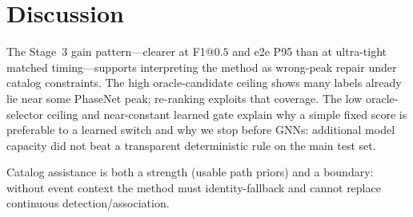 \section{Discussion}
\label{sec:discussion}

The Stage~3 gain pattern---clearer at F1@$0.5$ and e2e P95 than at ultra-tight
matched timing---supports interpreting the method as wrong-peak repair under
catalog constraints.
The high oracle-candidate ceiling shows many labels already lie near some
PhaseNet peak; re-ranking exploits that coverage.
The low oracle-selector ceiling and near-constant learned gate explain why a
simple fixed score is preferable to a learned switch and why we stop before
GNNs: additional model capacity did not beat a transparent deterministic rule
on the main test set.

Catalog assistance is both a strength (usable path priors) and a boundary:
without event context the method must identity-fallback and cannot replace
continuous detection/association.
